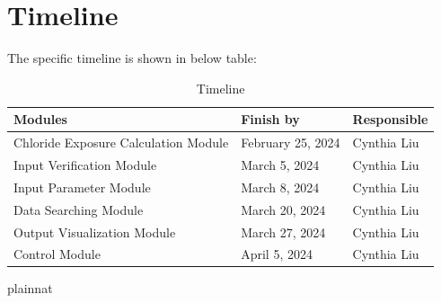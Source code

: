 \documentclass[12pt, titlepage]{article}
\begin{document}
\section{Timeline}
The specific timeline is shown in below table:
\begin{table}[H]
\centering
\begin{tabular}{p{} p{}  p{}}
\toprule
 \textbf{Modules} & \textbf{Finish by} & \textbf{Responsible} \\
\midrule
Chloride Exposure Calculation Module & February 25, 2024& Cynthia Liu\\
Input Verification Module & March 5, 2024 & Cynthia Liu\\
Input Parameter Module & March 8, 2024 & Cynthia Liu\\
Data Searching Module & March 20, 2024 & Cynthia Liu\\
Output Visualization Module  & March 27, 2024 & Cynthia Liu\\
Control Module & April 5, 2024 & Cynthia Liu\\

\bottomrule
\end{tabular}
\caption{Timeline}
\end{table}

 {plainnat}


\newpage{}
\end{document}
